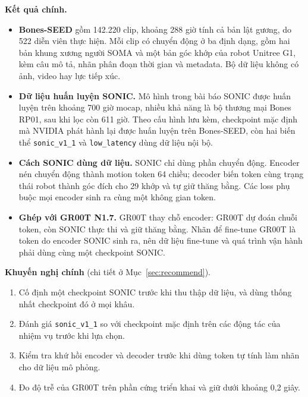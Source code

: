 \documentclass[12pt,a4paper,oneside]{report}
\newcommand{\code}[1]{\texttt{#1}}
\begin{document}
\textbf{Kết quả chính.}
\begin{itemize}
\item \textbf{Bones-SEED} gồm 142.220 clip, khoảng 288 giờ tính cả bản lật gương, do 522 diễn viên thực hiện. Mỗi clip có chuyển động ở ba định dạng, gồm hai bản khung xương người SOMA và một bản góc khớp của robot Unitree G1, kèm câu mô tả, nhãn phân đoạn thời gian và metadata. Bộ dữ liệu không có ảnh, video hay lực tiếp xúc.
\item \textbf{Dữ liệu huấn luyện SONIC.} Mô hình trong bài báo SONIC được huấn luyện trên khoảng 700 giờ mocap, nhiều khả năng là bộ thương mại Bones RP01, sau khi lọc còn 611 giờ. Theo cấu hình lưu kèm, checkpoint mặc định mà NVIDIA phát hành lại được huấn luyện trên Bones-SEED, còn hai biến thể \code{sonic\_v1\_1} và \code{low\_latency} dùng dữ liệu nội bộ.
\item \textbf{Cách SONIC dùng dữ liệu.} SONIC chỉ dùng phần chuyển động. Encoder nén chuyển động thành motion token 64 chiều; decoder biến token cùng trạng thái robot thành góc đích cho 29 khớp và tự giữ thăng bằng. Các loss phụ buộc mọi encoder sinh ra cùng một không gian token.
\item \textbf{Ghép với GR00T N1.7.} GR00T thay chỗ encoder: GR00T dự đoán chuỗi token, còn SONIC thực thi và giữ thăng bằng. Nhãn để fine-tune GR00T là token do encoder SONIC sinh ra, nên dữ liệu fine-tune và quá trình vận hành phải dùng cùng một checkpoint SONIC.
\end{itemize}

\textbf{Khuyến nghị chính} (chi tiết ở Mục~\ref{sec:recommend}).
\begin{enumerate}
\item Cố định một checkpoint SONIC trước khi thu thập dữ liệu, và dùng thống nhất checkpoint đó ở mọi khâu.
\item Đánh giá \code{sonic\_v1\_1} so với checkpoint mặc định trên các động tác của nhiệm vụ trước khi lựa chọn.
\item Kiểm tra khứ hồi encoder và decoder trước khi dùng token tự tính làm nhãn cho dữ liệu mô phỏng.
\item Đo độ trễ của GR00T trên phần cứng triển khai và giữ dưới khoảng 0,2 giây.
\end{enumerate}
\clearpage

\renewcommand{\contentsname}{MỤC LỤC}
\tableofcontents
\clearpage
\end{document}
